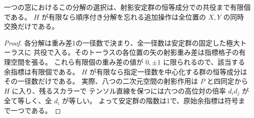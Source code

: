 \begin{corollary}\label{cor:split-finite-unmarking}
一つの窓におけるこの分解の選択は、射影安定群の恒等成分での共役まで有限個である。
$H$ が有限なら順序付き分解を忘れる追加操作は全位置の $X,Y$ の同時交換だけである。
\end{corollary}
\begin{proof}
各分解は重み差1の一径数で決まり、全一径数は安定群の固定した極大トーラスに
共役で入る。そのトーラスの各位置の矢の射影重み差は指標格子の有理空間を張る。
これら有限個の重み差の値が $0,\pm1$ に限られるので、該当する余指標は有限個である。
$H$ が有限なら指定一径数を中心化する群の恒等成分はその一径数だけである。
実際、八つの二次元空間の射影作用は $P$ と四同定から $H$ に入り、残るスカラーで
テンソル直線を保つには六つの高位対の倍率 $d_i d_j$ が全て等しく、全 $d_i$ が等しい。
よって安定群の階数は1で、原始余指標は符号まで一つである。
\end{proof}
